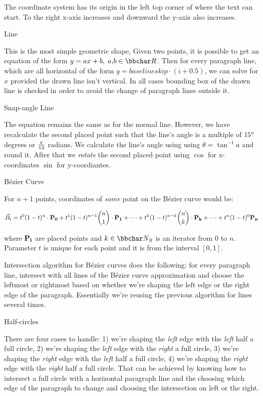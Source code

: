The coordinate system has its origin in the left top corner of where the text can start.
To the right x-axis increases and downward the y-axis also increases.

\curvetitle Line

This is the most simple geometric shape, Given two points, it is possible to get an equation
of the form $y = ax + b,\;a,\!b \in {\bbchar R}$. Then for every paragraph line, which are all
horizontal of the form $y = baselineskip \cdot (i + 0.5)$, we can solve for $x$
provided the drawn line isn't vertical. In all cases bounding box of the drawn line is checked
in order to avoid the change of paragraph lines outside it.

\curvetitle Snap-angle Line

The equation remains the same as for the normal line. However, we have recalculate the second placed
point such that the line's angle is a multiple of $\ang{15}$ degrees or $\pi \over 12$ radians.
We calculate the line's angle using using $\theta = \tan^{-1}{a}$ and round it.
After that we {\it rotate} the second placed point using $\cos$ for x-coordinates $\sin$
for y-coordiantes.

\curvetitle Bézier Curve

For $n+1$ points, coordinates of {\it some} point on the Bézier curve would be:

$$
\vec{B_t} =
t^0 (1-t)^n \cdot {\bf P_0} +
t^1 (1-t)^{n-1} {n \choose 1} \cdot {\bf P_1} +
\cdots +
t^k (1-t)^{n-k} {n \choose k} \cdot {\bf P_k} +
\cdots +
t^n (1-t)^0 {\bf P_n}
$$

where $\bf P_i$ are placed points and $k \in {\bbchar N}_0$ is an iterator from $0$ to $n$.
Parameter $t$ is unique for each point and it is from the interval $[0,1]$.

Intersection algorithm for Bézier curves does the following: for every paragraph
line, intersect with all lines of the Bézier curve approximation and choose the
leftmost or rightmost based on whether we're shaping the left edge or the right edge
of the paragraph. Essentially we're reusing the previous algorithm for lines several
times.

\curvetitle Half-circles

There are four cases to handle:
1) we're shaping the {\it left} edge with the {\it left} half a full circle,
2) we're shaping the {\it left} edge with the {\it right} a full circle,
3) we're shaping the {\it right} edge with the {\it left} half a full circle,
4) we're shaping the {\it right} edge with the {\it right} half a full circle.
That can be achieved by knowing how to intersect a full circle with a horizontal
paragraph line and the choosing which edge of the paragraph to change and choosing
the intersection on left or the right.

